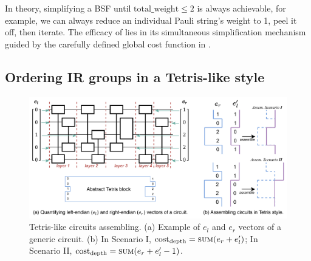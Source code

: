 \documentclass[conference,9pt]{IEEEtran}
\newcommand{\totalWeight}{\mathrm{total\_weight}}
\newcommand{\eRrightPre}{e_r}
\newcommand{\eLeftPost}{e_l'}
\begin{document}
    In theory, simplifying a BSF until $ \totalWeight \leq 2$ is always achievable, for example, we can always reduce an individual Pauli string's weight to 1, peel it off, then iterate. The efficacy of  lies in its simultaneous simplification mechanism guided by the carefully defined global cost function in . 



\subsection{Ordering IR groups in a Tetris-like style}

    \begin{figure}[tbp]
        \centering        
        \includegraphics[width=\columnwidth]{figures/empty_end.pdf}
        \caption{Tetris-like circuits assembling. (a) Example of $ e_l $ and $ e_r $ vectors of a generic circuit. (b) In Scenario I, $ \mathrm{cost}_\mathrm{depth} = \textsc{sum}(\eRrightPre + \eLeftPost) $; In Scenario II, $ \mathrm{cost}_\mathrm{depth} = \textsc{sum}(\eRrightPre + \eLeftPost - 1)  $.}%
        \label{fig:empty-end}
    \end{figure}
\end{document}
